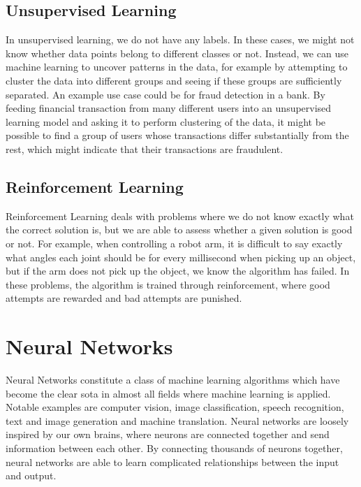 \documentclass[UKenglish]{uiomasterthesis} %
\theoremstyle{definition}
\begin{document}
\subsection{Unsupervised Learning}

In unsupervised learning, we do not have any labels. In these cases, we might not know whether data points belong to different classes or not. Instead, we can use machine learning to uncover patterns in the data, for example by attempting to cluster the data into different groups and seeing if these groups are sufficiently separated. An example use case could be for fraud detection in a bank. By feeding financial transaction from many different users into an unsupervised learning model and asking it to perform clustering of the data, it might be possible to find a group of users whose transactions differ substantially from the rest, which might indicate that their transactions are fraudulent.

\subsection{Reinforcement Learning}

Reinforcement Learning deals with problems where we do not know exactly what the correct solution is, but we are able to assess whether a given solution is good or not. For example, when controlling a robot arm, it is difficult to say exactly what angles each joint should be for every millisecond when picking up an object, but if the arm does not pick up the object, we know the algorithm has failed. In these problems, the algorithm is trained through reinforcement, where good attempts are rewarded and bad attempts are punished.

\section{Neural Networks}

Neural Networks constitute a class of machine learning algorithms which have become the clear \ac{sota} in almost all fields where machine learning is applied. Notable examples are computer vision, image classification, speech recognition, text and image generation and machine translation. Neural networks are loosely inspired by our own brains, where neurons are connected together and send information between each other. By connecting thousands of neurons together, neural networks are able to learn complicated relationships between the input and output.
\end{document}
